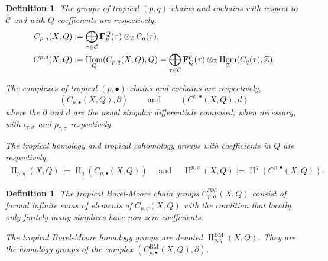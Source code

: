 \documentclass[11pt]{article}
\numberwithin{equation}{numsection}
\newcommand{\Z}{{\mathbb Z}}
\newcommand{\CC}{{\mathcal C}}
\newcommand{\imap}{\iota_{\tau,\sigma}}
\newcommand{\rmap}{\rho_{\tau,\sigma}}
\DeclareMathOperator{\Hom}{Hom}
\DeclareMathOperator{\BM}{BM}
\DeclareMathOperator{\HH}{H}
\newtheorem{defn}[thm]{Definition}
\begin{document}
\begin{defn}\label{def:tropchainhomo}
The groups of \emph{tropical} $(p,q)$-\emph{chains} and \emph{cochains} 
 with respect to $\CC$ and with $Q$-coefficients are respectively, 
\begin{align}
  C_{p,q}(X, Q) &:= \bigoplus_{\tau \in \CC} {\bf F}_p^{Q}(\tau) \otimes_{\Z} C_q(\tau),  \\
	C^{p,q}(X, Q) &:= \Hom_Q(C_{p,q}(X, Q), Q) = \bigoplus_{\tau \in \CC} {\bf F}^p_{Q}(\tau) \otimes_{\Z} \Hom_\Z(C_q(\tau),\Z). 
\end{align}

The complexes of tropical $(p, \bullet)$-chains and cochains are respectively, 
\[(C_{p,\bullet}(X, Q), \partial) \qquad \text{ and } \qquad  (C^{p,\bullet}(X, Q), d)\]
where the $\partial$ and $d$ are the usual singular differentials composed, when necessary, with $\imap$ and $\rmap$ respectively. 

The  \emph{tropical homology} and \emph{tropical cohomology} groups with coefficients in $Q$ are respectively, 
\begin{align*}
\HH_{p,q}(X, Q) := \HH_q( C_{p,\bullet}(X, Q)) \quad \text{ and } \quad 
\HH^{p,q}(X, Q) := \HH^q( C^{p,\bullet}(X, Q)). 
\end{align*}
\end{defn}

\begin{defn}\label{Borel-Moore}
The \emph{tropical Borel-Moore} chain groups $C_{p,q}^{\BM}(X, Q)$ consist of formal infinite sums
of elements of $C_{p, q}(X, Q)$ with the condition that locally only finitely many simplices have non-zero coefficients. 

The \emph{tropical Borel-Moore homology} groups  are denoted   $\HH_{p,q}^{\BM}(X, Q)$. 
They  are the homology groups of the complex 
$(C_{p,\bullet}^{\BM}(X, Q), \partial)$.
\end{defn}
\end{document}
